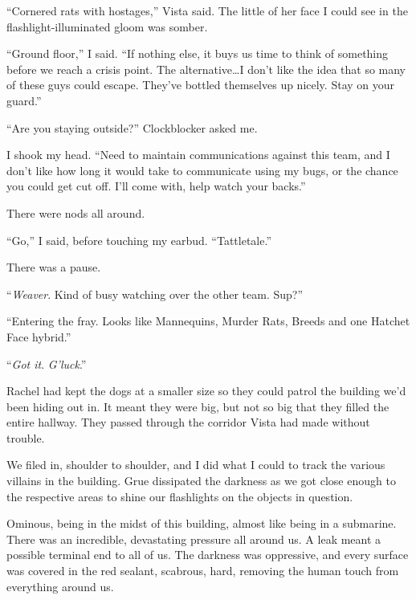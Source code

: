 ``Cornered rats with hostages,'' Vista said.  The little of her face I could see in the flashlight-illuminated gloom was somber.



``Ground floor,'' I said.  ``If nothing else, it buys us time to think of something before we reach a crisis point.  The alternative\ldots I don't like the idea that so many of these guys could escape.  They've bottled themselves up nicely.  Stay on your guard.''



``Are you staying outside?'' Clockblocker asked me.



I shook my head.  ``Need to maintain communications against this team, and I don't like how long it would take to communicate using my bugs, or the chance you could get cut off.  I'll come with, help watch your backs.''



There were nods all around.



``Go,'' I said, before touching my earbud.  ``Tattletale.''



There was a pause.



``\emph{Weaver}.  Kind of busy watching over the other team.  Sup?''



``Entering the fray.  Looks like Mannequins, Murder Rats, Breeds and one Hatchet Face hybrid.''



``\emph{Got it}.  \emph{G'luck}.''



Rachel had kept the dogs at a smaller size so they could patrol the building we'd been hiding out in.  It meant they were big, but not so big that they filled the entire hallway.  They passed through the corridor Vista had made without trouble.



We filed in, shoulder to shoulder, and I did what I could to track the various villains in the building.  Grue dissipated the darkness as we got close enough to the respective areas to shine our flashlights on the objects in question.



Ominous, being in the midst of this building, almost like being in a submarine.  There was an incredible, devastating pressure all around us.  A leak meant a possible terminal end to all of us.  The darkness was oppressive, and every surface was covered in the red sealant, scabrous, hard, removing the human touch from everything around us.



